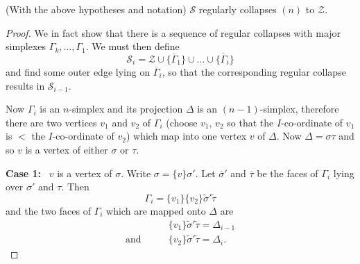 \setcounter{lemma}{1}
\begin{lemma}\label{chap7-lem7.1.2}
(With the above hypotheses and notation) $\mathscr{S}$ regularly collapses $(n)$ to $\mathscr{Z}$.
\end{lemma}

\begin{proof}
We in fact show that there is a sequence of regular collapses with major simplexes $\Gamma_{k},\ldots,\Gamma_{1}$. We must then define
$$
\mathscr{S}_{i}=\mathscr{Z}\cup \{\overline{\Gamma}_{1}\}\cup \ldots\cup \{\overline{\Gamma}_{i}\}
$$
and find some outer edge lying on $\overline{\Gamma}_{i}$, so that the corresponding regular collapse results in $\mathscr{S}_{i-1}$.

Now $\Gamma_{i}$ is an $n$-simplex and its projection $\Delta$ is an $(n-1)$-simplex, therefore there are two vertices $v_{1}$ and $v_{2}$ of $\Gamma_{i}$ (choose $v_{1}$, $v_{2}$ so that the $I$-co-ordinate of $v_{1}$ is $<$ the $I$-co-ordinate of $v_{2}$) which map into one vertex $v$ of $\Delta$. Now $\Delta=\sigma\tau$ and so $v$ is a vertex of either $\sigma$ or $\tau$.

\medskip
\noindent
{\bf Case 1:}~ $v$ is a vertex of $\sigma$. Write $\sigma=\{v\}\sigma'$. Let $\overline{\sigma}'$ and $\overline{\tau}$ be the faces of $\Gamma_{i}$ lying over $\sigma'$ and $\tau$. Then
$$
\Gamma_{i}=\{v_{1}\}\{v_{2}\}\tilde{\sigma}'\tilde{\tau}
$$
and the two faces of $\Gamma_{i}$ which are mapped onto $\Delta$ are
\begin{align*}
& \{v_{1}\}\tilde{\sigma}'\tilde{\tau}=\Delta_{i-1}\\
\text{and}\qquad & \{v_{2}\}\tilde{\sigma}'\tilde{\tau}=\Delta_{i}.
\end{align*}


\end{proof}
